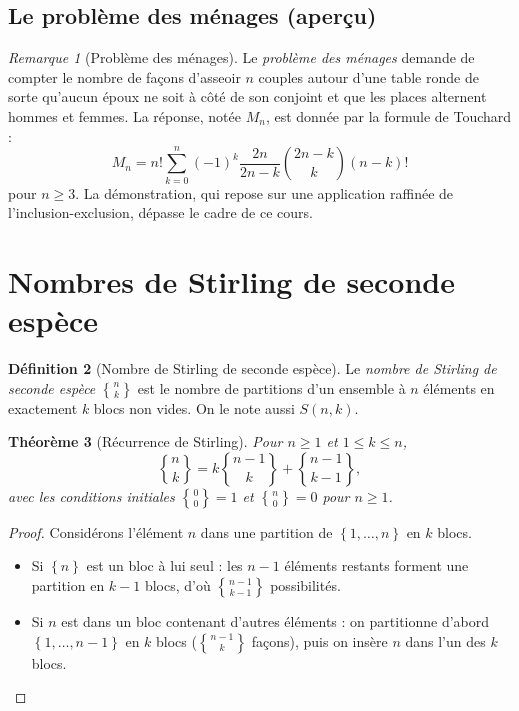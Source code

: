 \documentclass[12pt,a4paper,openany]{book}
\theoremstyle{definition}
\newtheorem{definition}{Définition}[chapter]
\theoremstyle{plain}
\newtheorem{theoreme}[definition]{Théorème}
\theoremstyle{remark}
\newtheorem{remarque}[definition]{Remarque}
\newcommand{\set}[1]{\left\{#1\right\}}
\begin{document}
\subsection{Le problème des ménages (aperçu)}
\label{sec:menage}

\begin{remarque}[Problème des ménages]
\label{rem:menage}
Le \emph{problème des ménages} demande de compter le nombre de façons
d'asseoir $n$ couples autour d'une table ronde de sorte qu'aucun époux
ne soit à côté de son conjoint et que les places alternent hommes et femmes.
La réponse, notée $M_n$, est donnée par la formule de Touchard :
\[
  M_n = n! \sum_{k=0}^{n} (-1)^k \frac{2n}{2n-k} \binom{2n-k}{k} (n-k)!
\]
pour $n \geqslant 3$. La démonstration, qui repose sur une application
raffinée de l'inclusion-exclusion, dépasse le cadre de ce cours.
\end{remarque}

\section{Nombres de Stirling de seconde espèce}
\label{sec:stirling}

\begin{definition}[Nombre de Stirling de seconde espèce]
\label{def:stirling-second}
Le \emph{nombre de Stirling de seconde espèce} $\genfrac{\{}{\}}{0pt}{}{n}{k}$
est le nombre de partitions d'un ensemble à $n$ éléments en exactement $k$
blocs non vides. On le note aussi $S(n,k)$.
\end{definition}

\begin{theoreme}[Récurrence de Stirling]
\label{thm:stirling-rec}
Pour $n \geqslant 1$ et $1 \leqslant k \leqslant n$,
\[
  \genfrac{\{}{\}}{0pt}{}{n}{k}
    = k \genfrac{\{}{\}}{0pt}{}{n-1}{k}
    + \genfrac{\{}{\}}{0pt}{}{n-1}{k-1},
\]
avec les conditions initiales $\genfrac{\{}{\}}{0pt}{}{0}{0} = 1$ et
$\genfrac{\{}{\}}{0pt}{}{n}{0} = 0$ pour $n \geqslant 1$.
\end{theoreme}

\begin{proof}
Considérons l'élément $n$ dans une partition de $\set{1,\dots,n}$ en $k$ blocs.
\begin{itemize}[nosep]
  \item Si $\set{n}$ est un bloc à lui seul : les $n-1$ éléments restants forment
    une partition en $k-1$ blocs, d'où $\genfrac{\{}{\}}{0pt}{}{n-1}{k-1}$ possibilités.
  \item Si $n$ est dans un bloc contenant d'autres éléments : on partitionne
    d'abord $\set{1,\dots,n-1}$ en $k$ blocs ($\genfrac{\{}{\}}{0pt}{}{n-1}{k}$ façons),
    puis on insère $n$ dans l'un des $k$ blocs. \qedhere
\end{itemize}
\end{proof}
\end{document}
